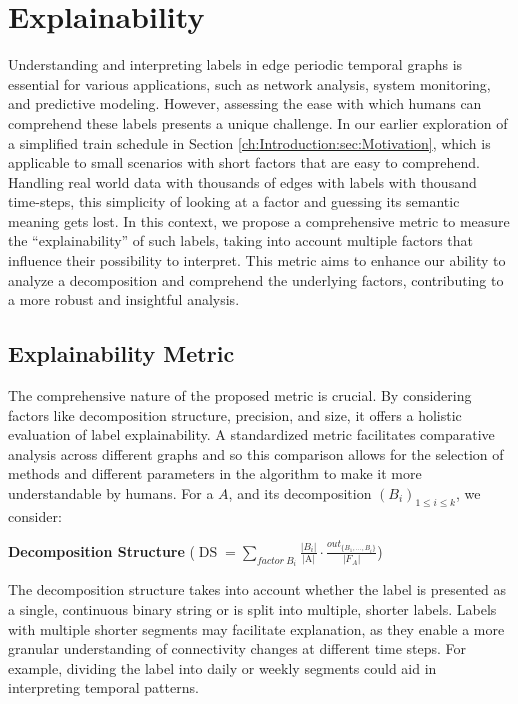 \chapter{Explainability}
Understanding and interpreting labels in edge periodic temporal graphs is essential for various applications, such as network analysis, system monitoring, and predictive modeling.
However, assessing the ease with which humans can comprehend these labels presents a unique challenge.
In our earlier exploration of a simplified train schedule in Section \ref{ch:Introduction:sec:Motivation}, which is applicable to small scenarios with short factors that are easy to comprehend.
Handling real world data with thousands of edges with labels with thousand time-steps, this simplicity of looking at a factor and guessing its semantic meaning gets lost.
In this context, we propose a comprehensive metric to measure the \enquote{explainability} of such labels, taking into account multiple factors that influence their possibility to interpret.
This metric aims to enhance our ability to analyze a decomposition and comprehend the underlying factors, contributing to a more robust and insightful analysis.

\section{Explainability Metric}
The comprehensive nature of the proposed metric is crucial.
By considering factors like decomposition structure, precision, and size, it offers a holistic evaluation of label explainability.
A standardized metric facilitates comparative analysis across different graphs and so this comparison allows for the selection of methods and different parameters in the algorithm to make it more understandable by humans. For a \DFA $A$, and its decomposition $(B_i)_{1 \leq i \leq k}$, we consider:

\textbf{Decomposition Structure} ($\operatorname{DS} = \sum\limits_{factor~ B_i}\frac{|B_i|}{\text{|A|}} \cdot \frac{out_{\{B_1,\dots,B_i\}}}{|F_A|}$)

The decomposition structure takes into account whether the label is presented as a single, continuous binary string or is split into multiple, shorter labels.
Labels with multiple shorter segments may facilitate explanation, as they enable a more granular understanding of connectivity changes at different time steps.
For example, dividing the label into daily or weekly segments could aid in interpreting temporal patterns.


